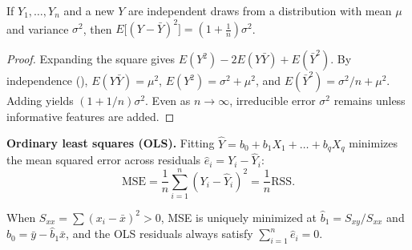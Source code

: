 \documentclass[10pt]{scrartcl}
\begin{document}
\begin{theorem*}
  If $Y_1,\dots,Y_n$ and a new $Y$ are independent draws from a distribution with mean $\mu$ and variance $\sigma^2$, then $E\bigl[(Y - \bar Y)^2\bigr] = \left(1 + \frac{1}{n}\right)\sigma^2$.
\end{theorem*}

\begin{proof}
  Expanding the square gives $E(Y^2) - 2E(Y\bar Y) + E(\bar Y^2)$. By independence (), $E(Y\bar Y) = \mu^2$, $E(Y^2) = \sigma^2 + \mu^2$, and $E(\bar Y^2) = \sigma^2/n + \mu^2$. Adding yields $(1 + 1/n)\sigma^2$. Even as $n \to \infty$, irreducible error $\sigma^2$ remains unless informative features are added.
\end{proof}

\medskip\noindent\textbf{Ordinary least squares (OLS).} Fitting $\hat Y = b_0 + b_1 X_1 + \dots + b_q X_q$ minimizes the mean squared error across residuals $\hat e_i = Y_i - \hat Y_i$:
\[
  \mathrm{MSE} = \frac{1}{n}\sum_{i=1}^n (Y_i - \hat Y_i)^2 = \frac{1}{n}\mathrm{RSS}.
\]

\begin{theorem*}
  When $S_{xx} = \sum (x_i - \bar x)^2 > 0$, MSE is uniquely minimized at $\hat b_1 = S_{xy}/S_{xx}$ and $\hat b_0 = \bar y - \hat b_1\bar x$, and the OLS residuals always satisfy $\sum_{i=1}^n \hat e_i = 0$.
\end{theorem*}
\end{document}
